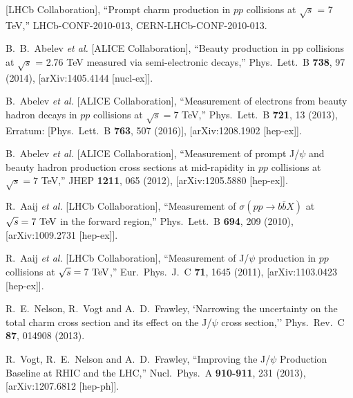 \documentclass[12pt,a4paper,final]{iopart} %
\begin{document}
\begin{thebibliography}{100}
  [LHCb Collaboration],
  ``Prompt charm production in $pp$ collisions at $\sqrt{s}$ = 7 TeV,''
  LHCb-CONF-2010-013, CERN-LHCb-CONF-2010-013.
  



  B.~B.~Abelev {\it et al.} [ALICE Collaboration],
  ``Beauty production in pp collisions at $\sqrt{s}$ = 2.76 TeV measured via semi-electronic decays,''
  Phys.\ Lett.\ B {\bf 738}, 97 (2014),
  [arXiv:1405.4144 [nucl-ex]].


  B.~Abelev {\it et al.} [ALICE Collaboration],
  ``Measurement of electrons from beauty hadron decays in $pp$ collisions at $\sqrt{s}=7$ TeV,''
  Phys.\ Lett.\ B {\bf 721}, 13 (2013), Erratum: [Phys.\ Lett.\ B {\bf 763}, 507 (2016)],
  [arXiv:1208.1902 [hep-ex]].

  
  B.~Abelev {\it et al.} [ALICE Collaboration],
  ``Measurement of prompt J/$\psi$ and beauty hadron production cross sections at mid-rapidity in $pp$ collisions at $\sqrt{s} = 7$ TeV,''
  JHEP {\bf 1211}, 065 (2012),
  [arXiv:1205.5880 [hep-ex]].
  

  R.~Aaij {\it et al.} [LHCb Collaboration],
  ``Measurement of $\sigma(pp \to b \bar{b} X)$ at $\sqrt{s}=7~\rm{TeV}$ in the forward region,''
  Phys.\ Lett.\ B {\bf 694}, 209 (2010),
  [arXiv:1009.2731 [hep-ex]].
  
  R.~Aaij {\it et al.} [LHCb Collaboration],
  ``Measurement of J/$\psi$ production in $pp$ collisions at $\sqrt{s}=7~\rm{TeV}$,''
  Eur.\ Phys.\ J.\ C {\bf 71}, 1645 (2011),
  [arXiv:1103.0423 [hep-ex]].


  R.~E.~Nelson, R.~Vogt and A.~D.~Frawley,
  `Narrowing the uncertainty on the total charm cross section and its effect on the J/$\psi$ cross section,''
  Phys.\ Rev.\ C {\bf 87}, 014908 (2013).

  R.~Vogt, R.~E.~Nelson and A.~D.~Frawley,
  ``Improving the J/$\psi$ Production Baseline at RHIC and the LHC,''
  Nucl.\ Phys.\ A {\bf 910-911}, 231 (2013),
  [arXiv:1207.6812 [hep-ph]].



\end{thebibliography}
\end{document}
